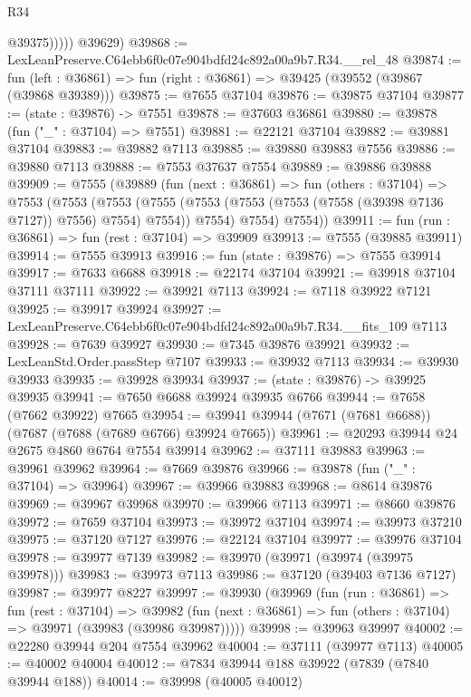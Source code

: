 \begin{lexlean}{R34}
\begin{coremodule}
                @39375)))))
      @39629)
@39868 := LexLeanPreserve.C64ebb6f0c07e904bdfd24c892a00a9b7.R34.__rel_48
@39874 := fun (left : @36861) => fun (right : @36861) => @39425 (@39552 (@39867 (@39868 @39389)))
@39875 := @7655 @37104
@39876 := @39875 @37104
@39877 := (state : @39876) -> @7551
@39878 := @37603 @36861
@39880 := @39878 (fun ("_" : @37104) => @7551)
@39881 := @22121 @37104
@39882 := @39881 @37104
@39883 := @39882 @7113
@39885 := @39880 @39883 @7556
@39886 := @39880 @7113
@39888 := @7553 @37637 @7554
@39889 := @39886 @39888
@39909 := @7555
    (@39889
      (fun (next : @36861) =>
      fun (others : @37104) =>
      @7553
        (@7553
          (@7553
            (@7555 (@7553 (@7553 (@7553 (@7558 (@39398 @7136 @7127)) @7556) @7554) @7554))
            @7554)
          @7554)
        @7554))
@39911 := fun (run : @36861) => fun (rest : @37104) => @39909
@39913 := @7555 (@39885 @39911)
@39914 := @7555 @39913
@39916 := fun (state : @39876) => @7555 @39914
@39917 := @7633 @6688
@39918 := @22174 @37104
@39921 := @39918 @37104 @37111 @37111
@39922 := @39921 @7113
@39924 := @7118 @39922 @7121
@39925 := @39917 @39924
@39927 := LexLeanPreserve.C64ebb6f0c07e904bdfd24c892a00a9b7.R34.__fits_109 @7113
@39928 := @7639 @39927
@39930 := @7345 @39876 @39921
@39932 := LexLeanStd.Order.passStep @7107
@39933 := @39932 @7113
@39934 := @39930 @39933
@39935 := @39928 @39934
@39937 := (state : @39876) -> @39925 @39935
@39941 := @7650 @6688 @39924 @39935 @6766
@39944 := @7658 (@7662 @39922) @7665
@39954 := @39941 @39944 (@7671 (@7681 @6688)) (@7687 (@7688 (@7689 @6766) @39924 @7665))
@39961 := @20293 @39944 @24 @2675 @4860 @6764 @7554 @39914
@39962 := @37111 @39883
@39963 := @39961 @39962
@39964 := @7669 @39876
@39966 := @39878 (fun ("_" : @37104) => @39964)
@39967 := @39966 @39883
@39968 := @8614 @39876
@39969 := @39967 @39968
@39970 := @39966 @7113
@39971 := @8660 @39876
@39972 := @7659 @37104
@39973 := @39972 @37104
@39974 := @39973 @37210
@39975 := @37120 @7127
@39976 := @22124 @37104
@39977 := @39976 @37104
@39978 := @39977 @7139
@39982 := @39970 (@39971 (@39974 (@39975 @39978)))
@39983 := @39973 @7113
@39986 := @37120 (@39403 @7136 @7127)
@39987 := @39977 @8227
@39997 := @39930
    (@39969
      (fun (run : @36861) =>
      fun (rest : @37104) =>
      @39982 (fun (next : @36861) => fun (others : @37104) => @39971 (@39983 (@39986 @39987)))))
@39998 := @39963 @39997
@40002 := @22280 @39944 @204 @7554 @39962
@40004 := @37111 (@39977 @7113)
@40005 := @40002 @40004
@40012 := @7834 @39944 @188 @39922 (@7839 (@7840 @39944 @188))
@40014 := @39998 (@40005 @40012)

\end{coremodule}
\end{lexlean}
